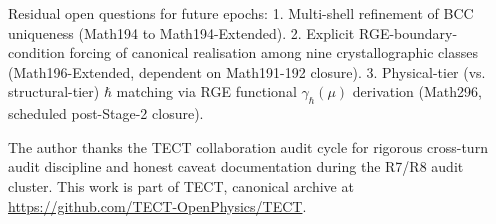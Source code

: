 Residual open questions for future epochs:
1. Multi-shell refinement of BCC uniqueness (Math194 to Math194-Extended).
2. Explicit RGE-boundary-condition forcing of canonical realisation among nine
   crystallographic classes (Math196-Extended, dependent on Math191-192 closure).
3. Physical-tier (vs. structural-tier) $\hbar$ matching via RGE functional $\gamma_\hbar(\mu)$ derivation
   (Math296, scheduled post-Stage-2 closure).

\begin{acknowledgments}
The author thanks the TECT collaboration audit cycle for rigorous
cross-turn audit discipline and honest caveat documentation during
the R7/R8 audit cluster. This work is part of TECT, canonical archive at
\url{https://github.com/TECT-OpenPhysics/TECT}.
\end{acknowledgments}





